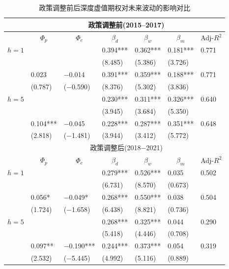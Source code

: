 \documentclass{setp-new}
\begin{document}
\begin{table}[H]
\centering
\caption{政策调整前后深度虚值期权对未来波动的影响对比}
\label{tab6}
\tabcolsep 9pt
    \begin{tabular}{rlllllr}
    \toprule
          & \multicolumn{6}{c}{政策调整前(2015--2017)} \\
          \midrule
   & \multicolumn{1}{c}{$\Phi_p$} & \multicolumn{1}{c}{$\Phi_c$}& \multicolumn{1}{c}{$\beta_d$} & \multicolumn{1}{c}{$\beta_w$}& \multicolumn{1}{c}{$\beta_m$} & \multicolumn{1}{c}{Adj-$R^2$}\\
                \midrule
    \multicolumn{1}{l}{$h=1$} &       &       & 0.394*** & 0.362*** & 0.181*** & \multicolumn{1}{l}{0.771} \\
          &       &       & (8.485) & (5.386) & (3.726) &  \\
          & 0.023 & $-$0.014 & 0.391*** & 0.359*** & 0.188*** & \multicolumn{1}{l}{0.771} \\
          & (0.787) & ($-$0.590) & (8.376) & (5.302) & (3.836) &  \\
    \multicolumn{1}{l}{$h=5$} &       &       & 0.230*** & 0.311*** & 0.326*** & \multicolumn{1}{l}{0.640} \\
          &       &       & (3.945) & (3.684) & (5.350) &  \\
          & 0.104*** & $-$0.045 & 0.228*** & 0.287*** & 0.351*** & \multicolumn{1}{l}{0.648} \\
          & (2.818) & ($-$1.481) & (3.944) & (3.412) & (5.772) &  \\
                \hline\hline
          & \multicolumn{6}{c}{政策调整后(2018$-$2021)} \\
                \midrule
  & \multicolumn{1}{c}{$\Phi_p$} & \multicolumn{1}{c}{$\Phi_c$}& \multicolumn{1}{c}{$\beta_d$} & \multicolumn{1}{c}{$\beta_w$}& \multicolumn{1}{c}{$\beta_m$} & \multicolumn{1}{c}{Adj-$R^2$}\\
                \midrule
    \multicolumn{1}{l}{$h=1$} &       &       & 0.279*** & 0.526*** & 0.035 & \multicolumn{1}{l}{0.502} \\
          &       &       & (6.731) & (8.570) & (0.673) &  \\
          & 0.056* & $-$0.049* & 0.268*** & 0.550*** & 0.038 & \multicolumn{1}{l}{0.504} \\
          & (1.724) & ($-$1.658) & (6.438) & (8.821) & (0.736) &  \\
    \multicolumn{1}{l}{$h=5$} &       &       & 0.268*** & 0.325*** & 0.044 & \multicolumn{1}{l}{0.290} \\
          &       &       & (5.418) & (4.446) & (0.708) &  \\
          & 0.097** & $-$0.190*** & 0.244*** & 0.373*** & 0.054 & \multicolumn{1}{l}{0.319} \\
          & (2.532) & ($-$5.445) & (4.992) & (5.116) & (0.889) &  \\
    \bottomrule
\end{tabular}
\end{table}
\end{document}
